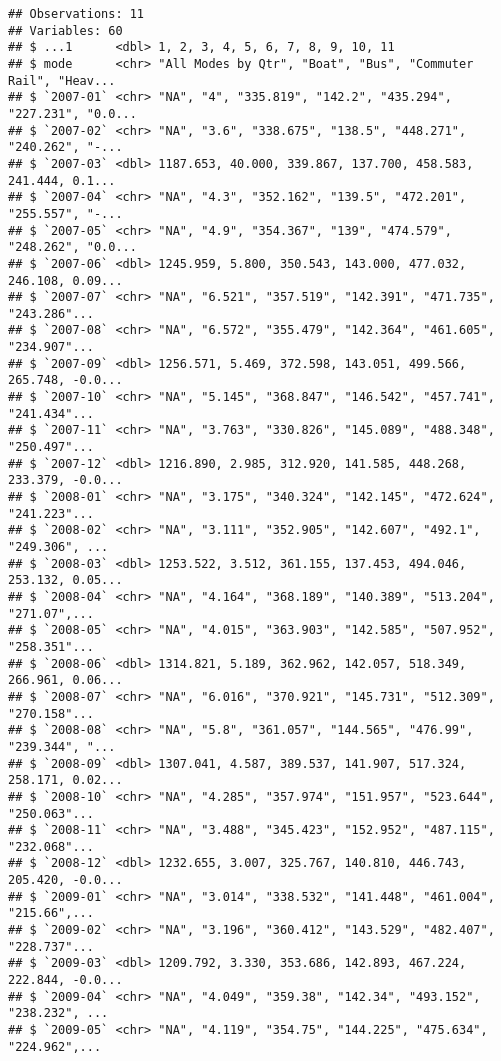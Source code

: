\documentclass[]{article}
\begin{document}
\begin{verbatim}
## Observations: 11
## Variables: 60
## $ ...1      <dbl> 1, 2, 3, 4, 5, 6, 7, 8, 9, 10, 11
## $ mode      <chr> "All Modes by Qtr", "Boat", "Bus", "Commuter Rail", "Heav...
## $ `2007-01` <chr> "NA", "4", "335.819", "142.2", "435.294", "227.231", "0.0...
## $ `2007-02` <chr> "NA", "3.6", "338.675", "138.5", "448.271", "240.262", "-...
## $ `2007-03` <dbl> 1187.653, 40.000, 339.867, 137.700, 458.583, 241.444, 0.1...
## $ `2007-04` <chr> "NA", "4.3", "352.162", "139.5", "472.201", "255.557", "-...
## $ `2007-05` <chr> "NA", "4.9", "354.367", "139", "474.579", "248.262", "0.0...
## $ `2007-06` <dbl> 1245.959, 5.800, 350.543, 143.000, 477.032, 246.108, 0.09...
## $ `2007-07` <chr> "NA", "6.521", "357.519", "142.391", "471.735", "243.286"...
## $ `2007-08` <chr> "NA", "6.572", "355.479", "142.364", "461.605", "234.907"...
## $ `2007-09` <dbl> 1256.571, 5.469, 372.598, 143.051, 499.566, 265.748, -0.0...
## $ `2007-10` <chr> "NA", "5.145", "368.847", "146.542", "457.741", "241.434"...
## $ `2007-11` <chr> "NA", "3.763", "330.826", "145.089", "488.348", "250.497"...
## $ `2007-12` <dbl> 1216.890, 2.985, 312.920, 141.585, 448.268, 233.379, -0.0...
## $ `2008-01` <chr> "NA", "3.175", "340.324", "142.145", "472.624", "241.223"...
## $ `2008-02` <chr> "NA", "3.111", "352.905", "142.607", "492.1", "249.306", ...
## $ `2008-03` <dbl> 1253.522, 3.512, 361.155, 137.453, 494.046, 253.132, 0.05...
## $ `2008-04` <chr> "NA", "4.164", "368.189", "140.389", "513.204", "271.07",...
## $ `2008-05` <chr> "NA", "4.015", "363.903", "142.585", "507.952", "258.351"...
## $ `2008-06` <dbl> 1314.821, 5.189, 362.962, 142.057, 518.349, 266.961, 0.06...
## $ `2008-07` <chr> "NA", "6.016", "370.921", "145.731", "512.309", "270.158"...
## $ `2008-08` <chr> "NA", "5.8", "361.057", "144.565", "476.99", "239.344", "...
## $ `2008-09` <dbl> 1307.041, 4.587, 389.537, 141.907, 517.324, 258.171, 0.02...
## $ `2008-10` <chr> "NA", "4.285", "357.974", "151.957", "523.644", "250.063"...
## $ `2008-11` <chr> "NA", "3.488", "345.423", "152.952", "487.115", "232.068"...
## $ `2008-12` <dbl> 1232.655, 3.007, 325.767, 140.810, 446.743, 205.420, -0.0...
## $ `2009-01` <chr> "NA", "3.014", "338.532", "141.448", "461.004", "215.66",...
## $ `2009-02` <chr> "NA", "3.196", "360.412", "143.529", "482.407", "228.737"...
## $ `2009-03` <dbl> 1209.792, 3.330, 353.686, 142.893, 467.224, 222.844, -0.0...
## $ `2009-04` <chr> "NA", "4.049", "359.38", "142.34", "493.152", "238.232", ...
## $ `2009-05` <chr> "NA", "4.119", "354.75", "144.225", "475.634", "224.962",...

\end{verbatim}
\end{document}
